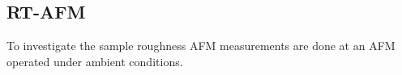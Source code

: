 	
	\subsection{RT-AFM}
	\label{sec:foil-AFM}
	To investigate the sample roughness AFM measurements are done at an AFM operated under ambient conditions.
	
